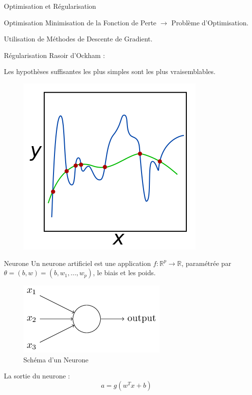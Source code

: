 \documentclass[11pt]{beamer}
\begin{document}
\begin{frame}{Optimisation et Régularisation}
	\begin{block}{Optimisation}
		Minimisation de la Fonction de Perte $\rightarrow$ Problème d'Optimisation.
		
		Utilisation de Méthodes de Descente de Gradient.
	\end{block}
	\begin{block}{Régularisation}
		Rasoir d'Ockham :
		\begin{displayquote}
			Les hypothèses suffisantes les plus simples sont les plus vraisemblables.
		\end{displayquote}
		\begin{figure}[H]
			\centering
			\includegraphics[scale=0.325]{Images/Regularization.png}
		\end{figure}
	\end{block}
\end{frame}

\begin{frame}{Neurone}
Un neurone artificiel est une application $f : \mathbb{R}^p \rightarrow \mathbb{R}$, paramétrée par $\theta = (b,w) = (b, w_1, ..., w_p)$, le biais et les poids.
\begin{figure}[H]
	\centering
	\includegraphics[scale=0.6]{Images/Neuron.png}
	\caption{Schéma d'un Neurone}
\end{figure}
La sortie du neurone :
$$a = g(w^Tx + b)$$
\end{frame}
\end{document}
